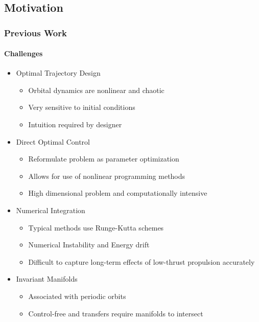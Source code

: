 \section*{}
\subsection*{Motivation}

\begin{frame} %
\frametitle{Previous Work} %
\framesubtitle{Challenges}
\begin{itemize}
	\item Optimal Trajectory Design
		\begin{itemize}
			\item Orbital dynamics are nonlinear and chaotic
			\item Very sensitive to initial conditions
			\item Intuition required by designer
		\end{itemize}
	\pause
	\item Direct Optimal Control
		\begin{itemize}
			\item Reformulate problem as parameter optimization
			\item Allows for use of nonlinear programming methods
			\item High dimensional problem and computationally intensive
		\end{itemize}
	\pause
	\item Numerical Integration
		\begin{itemize}
			\item Typical methods use Runge-Kutta schemes
			\item Numerical Instability and Energy drift
			\item Difficult to capture  long-term effects of low-thrust propulsion accurately
		\end{itemize}
	\pause
	\item Invariant Manifolds
		\begin{itemize}
			\item Associated with periodic orbits
			\item Control-free and transfers require manifolds to intersect
		\end{itemize}
\end{itemize}
\end{frame}   %

